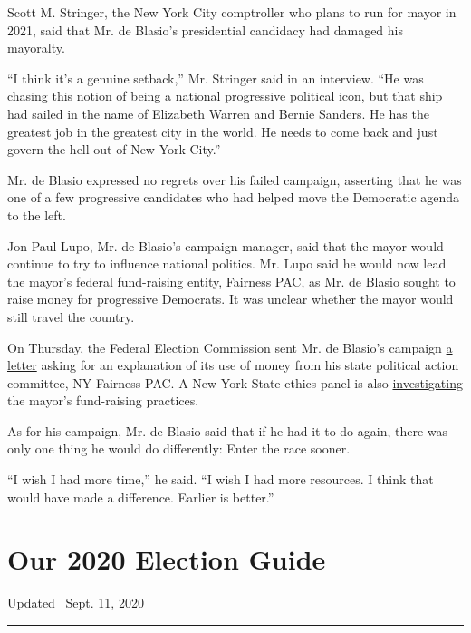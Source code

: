 Scott M. Stringer, the New York City comptroller who plans to run for
mayor in 2021, said that Mr. de Blasio's presidential candidacy had
damaged his mayoralty.

``I think it's a genuine setback,'' Mr. Stringer said in an interview.
``He was chasing this notion of being a national progressive political
icon, but that ship had sailed in the name of Elizabeth Warren and
Bernie Sanders. He has the greatest job in the greatest city in the
world. He needs to come back and just govern the hell out of New York
City.''

Mr. de Blasio expressed no regrets over his failed campaign, asserting
that he was one of a few progressive candidates who had helped move the
Democratic agenda to the left.

Jon Paul Lupo, Mr. de Blasio's campaign manager, said that the mayor
would continue to try to influence national politics. Mr. Lupo said he
would now lead the mayor's federal fund-raising entity, Fairness PAC, as
Mr. de Blasio sought to raise money for progressive Democrats. It was
unclear whether the mayor would still travel the country.

On Thursday, the Federal Election Commission sent Mr. de Blasio's
campaign
\href{https://docquery.fec.gov/pdf/058/201909190300048058/201909190300048058.pdf}{a
letter} asking for an explanation of its use of money from his state
political action committee, NY Fairness PAC. A New York State ethics
panel is also
\href{https://www.nytimes3xbfgragh.onion/2019/09/19/nyregion/de-blasio-2020-ethics.html?rref=collection\%2Fbyline\%2Fjeffery-c.-mays\&action=click\&contentCollection=undefined\&region=stream\&module=stream_unit\&version=latest\&contentPlacement=2\&pgtype=collection}{investigating}
the mayor's fund-raising practices.

As for his campaign, Mr. de Blasio said that if he had it to do again,
there was only one thing he would do differently: Enter the race sooner.

``I wish I had more time,'' he said. ``I wish I had more resources. I
think that would have made a difference. Earlier is better.''

\hypertarget{our-2020-election-guide}{%
\section{Our 2020 Election Guide}\label{our-2020-election-guide}}

Updated ~Sept. 11, 2020

\begin{center}\rule{0.5\linewidth}{\linethickness}\end{center}

